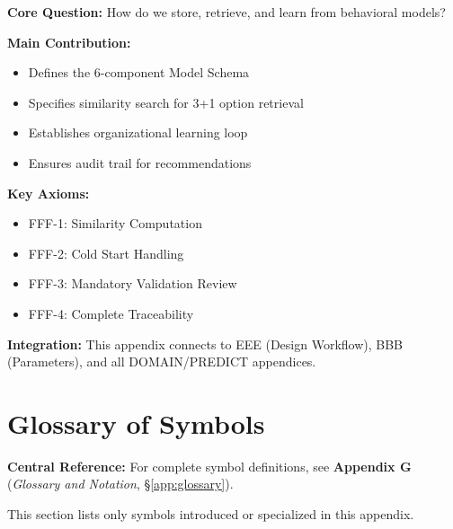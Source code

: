 \begin{tcolorbox}[colback=green!10!white, colframe=green!75!black,
    title=\textbf{Appendix FFF: Summary}]

\textbf{Core Question:} How do we store, retrieve, and learn from behavioral models?

\textbf{Main Contribution:}
\begin{itemize}[nosep]
    \item Defines the 6-component Model Schema
    \item Specifies similarity search for 3+1 option retrieval
    \item Establishes organizational learning loop
    \item Ensures audit trail for recommendations
\end{itemize}

\textbf{Key Axioms:}
\begin{itemize}[nosep]
    \item FFF-1: Similarity Computation
    \item FFF-2: Cold Start Handling
    \item FFF-3: Mandatory Validation Review
    \item FFF-4: Complete Traceability
\end{itemize}

\textbf{Integration:} This appendix connects to EEE (Design Workflow),
BBB (Parameters), and all DOMAIN/PREDICT appendices.

\end{tcolorbox}


\section{Glossary of Symbols}
\label{sec:fff-glossary}

\begin{tcolorbox}[colback=blue!5!white, colframe=blue!75!black]
\textbf{Central Reference:} For complete symbol definitions, see
\textbf{Appendix G} (\textit{Glossary and Notation}, \S\ref{app:glossary}).

This section lists only symbols introduced or specialized in this appendix.
\end{tcolorbox}

\vspace{0.5em}

